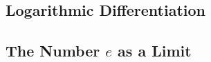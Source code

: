 \documentclass%
[handout]
{beamer}
\theoremstyle{partialproof} \newtheorem{partialproof}[theorem]{Proof.}
\begin{document}
\subsection{Logarithmic Differentiation}




\subsection{The Number $e$ as a Limit}

\end{document}
